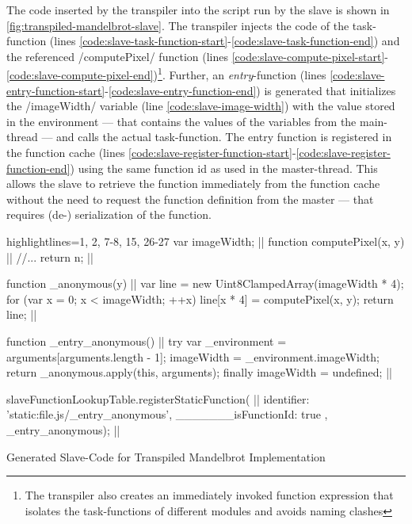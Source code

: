 The code inserted by the transpiler into the script run by the slave is shown in \cref{fig:transpiled-mandelbrot-slave}. The transpiler injects the code of the task-function (lines \ref{code:slave-task-function-start}-\ref{code:slave-task-function-end}) and the referenced \javascriptinline/computePixel/ function (lines \ref{code:slave-compute-pixel-start}-\ref{code:slave-compute-pixel-end})\footnote{The transpiler also creates an immediately invoked function expression that isolates the task-functions of different modules and avoids naming clashes}. Further, an \textit{entry}-function (lines \ref{code:slave-entry-function-start}-\ref{code:slave-entry-function-end}) is generated that initializes the \javascriptinline/imageWidth/ variable (line \ref{code:slave-image-width}) with the value stored in the environment --- that contains the values of the variables from the main-thread --- and calls the actual task-function. The entry function is registered in the function cache (lines \ref{code:slave-register-function-start}-\ref{code:slave-register-function-end}) using the same function id as used in the master-thread. This allows the slave to retrieve the function immediately from the function cache without the need to request the function definition from the master --- that requires (de-) serialization of the function.

\begin{listing}
\begin{javascriptcode*}{highlightlines={1, 2, 7-8, 15, 26-27}}
var imageWidth; |$\label{code:slave-image-width}$|
function computePixel(x, y) { |$\label{code:slave-compute-pixel-start}$|
	//...
	return n;
}|$\label{code:slave-compute-pixel-end}$|

function _anonymous(y) { |$\label{code:slave-task-function-start}$|
	var line = new Uint8ClampedArray(imageWidth * 4);
	for (var x = 0; x < imageWidth; ++x) {
		line[x * 4] = computePixel(x, y);
	}
	return line;
}|$\label{code:slave-task-function-end}$|

function _entry_anonymous() { |$\label{code:slave-entry-function-start}$|
	try {
		var _environment = arguments[arguments.length - 1];
		imageWidth = _environment.imageWidth;
		return _anonymous.apply(this, arguments);
	} finally {
		imageWidth = undefined;
	}
}|$\label{code:slave-entry-function-end}$|

slaveFunctionLookupTable.registerStaticFunction({ |$\label{code:slave-register-function-start}$|
	identifier: 'static:file.js/_entry_anonymous',
	_______isFunctionId: true
}, _entry_anonymous); |$\label{code:slave-register-function-end}$|
\end{javascriptcode*}
\caption{Generated Slave-Code for Transpiled Mandelbrot Implementation}
\label{fig:transpiled-mandelbrot-slave}
\end{listing}

